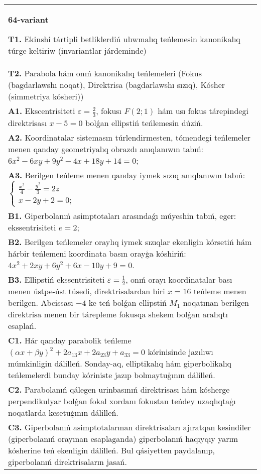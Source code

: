 \documentclass{article}
\begin{document}
\begin{tabular}{m{17cm}}
\textbf{64-variant}
\newline

\textbf{T1.} Ekinshi tártipli betliklerdiń ulıwmalıq teńlemesin kanonikalıq túrge keltiriw (invariantlar járdeminde) \\
\textbf{T2.} Parabola hám onıń kanonikalıq teńlemeleri (Fokus (bagdarlawshı noqat), Direktrisa (bagdarlawshı sızıq), Kósher (simmetriya kósheri)) \\
\textbf{A1.} Ekscentrisiteti $\varepsilon=\frac{2}{3}$, fokusı $F (2; 1) $ hám usı fokus tárepindegi direktrisası $x-5=0$ bolǵan ellipstiń teńlemesin dúziń. \\
\textbf{A2.} Koordinatalar sistemasın túrlendirmesten, tómendegi teńlemeler menen qanday geometriyalıq obrazdı anıqlanıwın tabıń: $6 x^2-6 x y+9 y^2-4 x+18 y+14=0$; \\
\textbf{A3.} Berilgen teńleme menen qanday iymek sızıq anıqlanıwın tabıń: $\left\{\begin{array}{l}\frac{x^2}{4}-\frac{y^2}{3}=2 z \\ x-2 y+2=0 ;\end{array}\right.$ \\
\textbf{B1.} Giperbolanıń asimptotaları arasındaǵı múyeshin tabıń, eger: ekssentrisiteti $e=2$; \\
\textbf{B2.} Berilgen teńlemeler oraylıq iymek sızıqlar ekenligin kórsetiń hám hárbir teńlemeni koordinata basın orayģa kóshiriń:  $4 x^2+2 x y+6 y^2+6 x-10 y+9=0$. \\
\textbf{B3.} Ellipstiń ekssentrisiteti $\varepsilon=\frac{1}{2}$, onıń orayı koordinatalar bası menen ústpe-úst túsedi, direktrisalardan biri $x=16$ teńleme menen berilgen. Abcissası $-4$ ke teń bolǵan ellipstiń $M_1$ noqatınan berilgen direktrisa menen bir tárepleme fokusqa shekem bolǵan aralıqtı esaplań. \\
\textbf{C1.} Hár qanday parabolik teńleme $ (\alpha x+\beta y) ^2+2a_{13}x+2a_{23}y+a_{33}=0$ kórinisinde jazılıwı múmkinligin dálilleń. Sonday-aq, elliptikalıq hám giperbolikalıq teńlemelerdi bunday kóriniste jazıp bolmaytuģının dálilleń. \\
\textbf{C2.} Parabolanıń qálegen urinbasınıń direktrisası hám kósherge perpendikulyar bolǵan fokal xordanı fokustan teńdey uzaqlıqtaģı noqatlarda kesetuģının dálilleń. \\
\textbf{C3.} Giperbolanıń asimptotalarınan direktrisaları ajıratqan kesindiler (giperbolanıń orayınan esaplaganda) giperbolanıń haqıyqıy yarım kósherine teń ekenligin dálilleń. Bul qásiyetten paydalanıp, giperbolanıń direktrisaların jasań. \\

\end{tabular}
\vspace{1cm}
\end{document}
